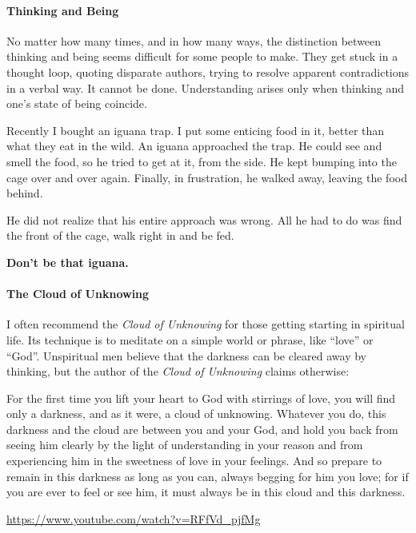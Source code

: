 \paragraph{Thinking and Being}


No matter how many times, and in how many ways, the distinction between thinking and being seems difficult for some people to make. They get stuck in a thought loop, quoting disparate authors, trying to resolve apparent contradictions in a verbal way. It cannot be done. Understanding arises only when thinking and one's state of being coincide.

Recently I bought an iguana trap. I put some enticing food in it, better than what they eat in the wild. An iguana approached the trap. He could see and smell the food, so he tried to get at it, from the side. He kept bumping into the cage over and over again. Finally, in frustration, he walked away, leaving the food behind.

He did not realize that his entire approach was wrong. All he had to do was find the front of the cage, walk right in and be fed.

\textbf{Don't be that iguana.}


\paragraph{The Cloud of Unknowing}


I often recommend the \textit{Cloud of Unknowing} for those getting starting in spiritual life. Its technique is to meditate on a simple world or phrase, like ``love'' or ``God''. Unspiritual men believe that the darkness can be cleared away by thinking, but the author of the \textit{Cloud of Unknowing} claims otherwise:

\begin{quotex}
For the first time you lift your heart to God with stirrings of love, you will find only a darkness, and as it were, a cloud of unknowing. Whatever you do, this darkness and the cloud are between you and your God, and hold you back from seeing him clearly by the light of understanding in your reason and from experiencing him in the sweetness of love in your feelings. And so prepare to remain in this darkness as long as you can, always begging for him you love; for if you are ever to feel or see him, it must always be in this cloud and this darkness.
\end{quotex}

\url{https://www.youtube.com/watch?v=RFfVd\_pjfMg} 


